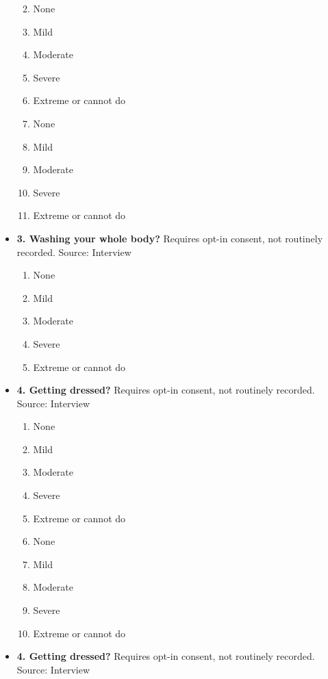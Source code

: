 \documentclass[
]{scrartcl}
\providecommand{\tightlist}{%
  \setlength{\itemsep}{0pt}\setlength{\parskip}{0pt}}\usepackage{longtable,booktabs,array}
\begin{document}
\begin{itemize}
  \begin{enumerate}
  \def\labelenumi{\arabic{enumi}.}
  \tightlist
  \item
    None
  \item
    Mild
  \item
    Moderate
  \item
    Severe
  \item
    Extreme or cannot do
  \item
    None
  \item
    Mild
  \item
    Moderate
  \item
    Severe
  \item
    Extreme or cannot do
  \end{enumerate}
\item
  \textbf{3. Washing your whole body?} Requires opt-in consent, not
  routinely recorded. Source: Interview

  \begin{enumerate}
  \def\labelenumi{\arabic{enumi}.}
  \tightlist
  \item
    None
  \item
    Mild
  \item
    Moderate
  \item
    Severe
  \item
    Extreme or cannot do
  \end{enumerate}
\item
  \textbf{4. Getting dressed?} Requires opt-in consent, not routinely
  recorded. Source: Interview

  \begin{enumerate}
  \def\labelenumi{\arabic{enumi}.}
  \tightlist
  \item
    None
  \item
    Mild
  \item
    Moderate
  \item
    Severe
  \item
    Extreme or cannot do
  \item
    None
  \item
    Mild
  \item
    Moderate
  \item
    Severe
  \item
    Extreme or cannot do
  \end{enumerate}
\item
  \textbf{4. Getting dressed?} Requires opt-in consent, not routinely
  recorded. Source: Interview


\end{itemize}
\end{document}
